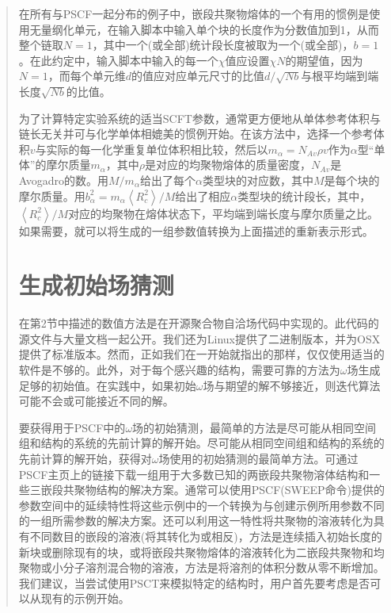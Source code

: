 \documentclass{article}
\begin{document}
\begin{CJK}{UTF8}{gkai}
\begin{quotation}
在所有与PSCF一起分布的例子中，嵌段共聚物熔体的一个有用的惯例是使用无量纲化单元，在输入脚本中输入单个块的长度作为分数值加到1，从而整个链取$N=1$，其中一个(或全部)统计段长度被取为一个(或全部)，$b=1$。在此约定中，输入脚本中输入的每一个$\chi$值应设置$\chi N$的期望值，因为$N=1$，而每个单元维$d$的值应对应单元尺寸的比值$d/\sqrt{Nb}$与根平均端到端长度$\sqrt{Nb}$的比值。

为了计算特定实验系统的适当SCFT参数，通常更方便地从单体参考体积与链长无关并可与化学单体相媲美的惯例开始。在该方法中，选择一个参考体积$v$与实际的每一化学重复单位体积相比较，然后以$m_{\alpha}=N_{Av}\rho v$作为$\alpha$型“单体”的摩尔质量$m_{\alpha}$，其中$\rho$是对应的均聚物熔体的质量密度，$N_{Av}$是Avogadro的数。用$M/m_{\alpha}$给出了每个$\alpha$类型块的对应数，其中$M$是每个块的摩尔质量。用$b_{\alpha}^2=m_{\alpha}\left\langle R_c^2 \right\rangle/M $给出了相应$\alpha$类型块的统计段长，其中，$\left\langle R_c^2 \right\rangle/M$对应的均聚物在熔体状态下，平均端到端长度与摩尔质量之比。如果需要，就可以将生成的一组参数值转换为上面描述的重新表示形式。\\
\section{生成初始场猜测}
在第2节中描述的数值方法是在开源聚合物自洽场代码中实现的。此代码的源文件与大量文档一起公开。我们还为Linux提供了二进制版本，并为OSX提供了标准版本。然而，正如我们在一开始就指出的那样，仅仅使用适当的软件是不够的。此外，对于每个感兴趣的结构，需要可靠的方法为$\omega$场生成足够的初始值。在实践中，如果初始$\omega$场与期望的解不够接近，则迭代算法可能不会或可能接近不同的解。

要获得用于PSCF中的$\omega$场的初始猜测，最简单的方法是尽可能从相同空间组和结构的系统的先前计算的解开始。尽可能从相同空间组和结构的系统的先前计算的解开始，获得对$\omega$场使用的初始猜测的最简单方法。可通过PSCF主页上的链接下载一组用于大多数已知的两嵌段共聚物溶体结构和一些三嵌段共聚物结构的解决方案。通常可以使用PSCF(SWEEP命令)提供的参数空间中的延续特性将这些示例中的一个转换为与创建示例所用参数不同的一组所需参数的解决方案。还可以利用这一特性将共聚物的溶液转化为具有不同数目的嵌段的溶液(将其转化为或相反)，方法是连续插入初始长度的新块或删除现有的块，或将嵌段共聚物熔体的溶液转化为二嵌段共聚物和均聚物或小分子溶剂混合物的溶液，方法是将溶剂的体积分数从零不断增加。我们建议，当尝试使用PSCT来模拟特定的结构时，用户首先要考虑是否可以从现有的示例开始。


\end{quotation}
\end{CJK}
\end{document}
